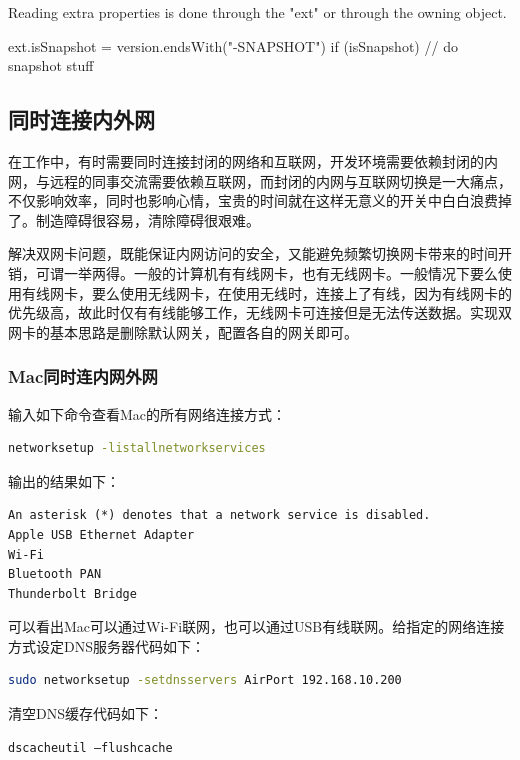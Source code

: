 \documentclass[letter]{book}
\begin{document}
Reading extra properties is done through the "ext" or through the owning object.


ext.isSnapshot = version.endsWith("-SNAPSHOT")
if (isSnapshot) {
	// do snapshot stuff
}

\subsection{同时连接内外网}

在工作中，有时需要同时连接封闭的网络和互联网，开发环境需要依赖封闭的内网，与远程的同事交流需要依赖互联网，而封闭的内网与互联网切换是一大痛点，不仅影响效率，同时也影响心情，宝贵的时间就在这样无意义的开关中白白浪费掉了。制造障碍很容易，清除障碍很艰难。

解决双网卡问题，既能保证内网访问的安全，又能避免频繁切换网卡带来的时间开销，可谓一举两得。一般的计算机有有线网卡，也有无线网卡。一般情况下要么使用有线网卡，要么使用无线网卡，在使用无线时，连接上了有线，因为有线网卡的优先级高，故此时仅有有线能够工作，无线网卡可连接但是无法传送数据。实现双网卡的基本思路是删除默认网关，配置各自的网关即可。

\subsubsection{Mac同时连内网外网}

输入如下命令查看Mac的所有网络连接方式：

\begin{lstlisting}[language=Bash]
networksetup -listallnetworkservices
\end{lstlisting}

输出的结果如下：

\begin{lstlisting}
An asterisk (*) denotes that a network service is disabled.
Apple USB Ethernet Adapter
Wi-Fi
Bluetooth PAN
Thunderbolt Bridge
\end{lstlisting}

可以看出Mac可以通过Wi-Fi联网，也可以通过USB有线联网。给指定的网络连接方式设定DNS服务器代码如下：

\begin{lstlisting}[language=Bash]
sudo networksetup -setdnsservers AirPort 192.168.10.200
\end{lstlisting}

清空DNS缓存代码如下：

\begin{lstlisting}[language=Bash]
dscacheutil –flushcache
\end{lstlisting}
\end{document}
